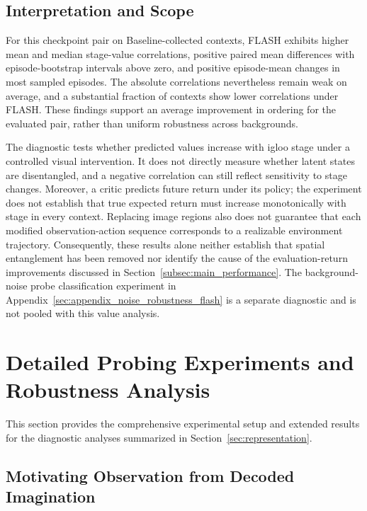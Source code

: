 \documentclass{article} %
\begin{document}
\subsection{Interpretation and Scope}
For this checkpoint pair on Baseline-collected contexts, FLASH exhibits higher mean and median stage-value correlations, positive paired mean differences with episode-bootstrap intervals above zero, and positive episode-mean changes in most sampled episodes. The absolute correlations nevertheless remain weak on average, and a substantial fraction of contexts show lower correlations under FLASH. These findings support an average improvement in ordering for the evaluated pair, rather than uniform robustness across backgrounds.

The diagnostic tests whether predicted values increase with igloo stage under a controlled visual intervention. It does not directly measure whether latent states are disentangled, and a negative correlation can still reflect sensitivity to stage changes. Moreover, a critic predicts future return under its policy; the experiment does not establish that true expected return must increase monotonically with stage in every context. Replacing image regions also does not guarantee that each modified observation-action sequence corresponds to a realizable environment trajectory. 
Consequently, these results alone neither establish that spatial entanglement has been removed nor identify the cause of the evaluation-return improvements discussed in Section~\ref{subsec:main_performance}. The background-noise probe classification experiment in Appendix~\ref{sec:appendix_noise_robustness_flash} is a separate diagnostic and is not pooled with this value analysis.

\onecolumn

\section{Detailed Probing Experiments and Robustness Analysis}
\label{sec:appendix_detailed_probing}
This section provides the comprehensive experimental setup and extended results for the diagnostic analyses summarized in Section~\ref{sec:representation}.

\subsection{Motivating Observation from Decoded Imagination}
\end{document}
